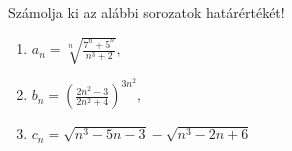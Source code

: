 \documentclass[11pt]{scrartcl}
\begin{document}
Számolja ki az alábbi sorozatok határértékét!
\begin{enumerate}
	\item \(\displaystyle
	      a_n = \sqrt[n]{\frac{7^n + 5^n}{n^3 + 2}},
	      \)

	\item \(\displaystyle
	      b_n = \left(
	      \frac{2n^2 - 3}{2n^2 + 4}
	      \right)^{3n^2},
	      \)

	\item \(\displaystyle
	      c_n = \sqrt{n^3 - 5n - 3} - \sqrt{n^3 - 2n + 6}
	      \)
\end{enumerate}
\end{document}
